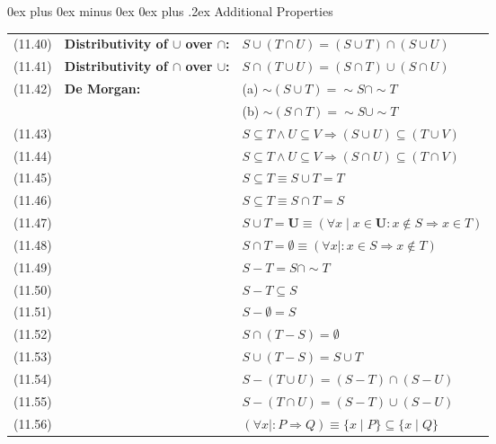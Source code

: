 \documentclass[letterpaper, 8pt]{extarticle}
\makeatletter
\renewcommand{\subsection}{\@startsection{subsection}{2}{0mm}%
                                {0ex plus 0ex minus 0ex}%
                                {0ex plus .2ex}%
                                {\normalfont\small\bfseries}}
\newcommand{\To}{\Rightarrow}
\makeatother
\begin{document}
\begin{multicols*}{3}
    \subsection{Additional Properties}
    \begin{tabulary}{\linewidth}{@{}lLL@{}}
        (11.40) & \textbf{Distributivity of $\cup$ over $\cap$:} & $S \cup (T \cap U) = (S \cup T) \cap (S \cup U)$ \\
        (11.41) & \textbf{Distributivity of $\cap$ over $\cup$:} & $S \cap (T \cup U) = (S \cap T) \cup (S \cap U)$ \\
        (11.42) & \textbf{De Morgan:} & (a) $\sim (S \cup T) = \sim S \cap \sim T$ \\
        & & (b) $\sim (S \cap T) = \sim S \cup \sim T$ \\
        (11.43) & & $S \subseteq T \land U \subseteq V \To (S \cup U) \subseteq (T \cup V)$ \\
        (11.44) & & $S \subseteq T \land U \subseteq V \To (S \cap U) \subseteq (T \cap V)$ \\
        (11.45) & & $S \subseteq T \equiv S \cup T = T$ \\
        (11.46) & & $S \subseteq T \equiv S \cap T = S$ \\
        (11.47) & & $S \cup T = \mathbf{U} \equiv (\forall x \mid x \in \mathbf{U} : x \notin S \To x \in T)$ \\
        (11.48) & & $S \cap T = \emptyset \equiv (\forall x \mid : x \in S \To x \notin T)$ \\
        (11.49) & & $S - T = S \cap \sim T$ \\
        (11.50) & & $S - T \subseteq S$ \\
        (11.51) & & $S - \emptyset = S$ \\
        (11.52) & & $S \cap (T - S) = \emptyset$ \\
        (11.53) & & $S \cup (T - S) = S \cup T$ \\
        (11.54) & & $S - (T \cup U) = (S - T) \cap (S - U)$ \\
        (11.55) & & $S - (T \cap U) = (S - T) \cup (S - U)$ \\
        (11.56) & & $(\forall x \mid : P \To Q) \equiv \{ x \mid P \} \subseteq \{x \mid Q \}$ \\

\end{tabulary}
\end{multicols*}
\end{document}
